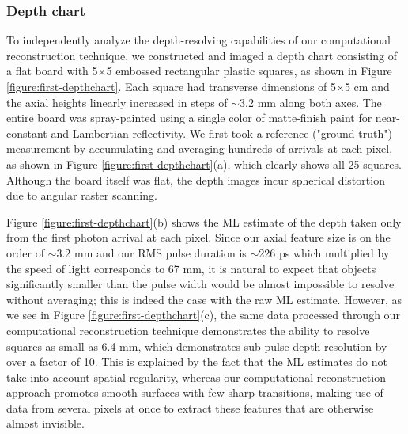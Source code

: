 \subsubsection{Depth chart}

To independently analyze the depth-resolving capabilities of our computational reconstruction technique, we constructed and imaged a depth chart consisting of a flat board with 5$\times$5 embossed rectangular plastic squares, as shown in Figure \ref{figure:first-depthchart}. Each square had transverse dimensions of 5$\times$5 cm and the axial heights linearly increased in steps of $\sim$3.2 mm along both axes. The entire board was spray-painted using a single color of matte-finish paint for near-constant and Lambertian reflectivity. We first took a reference ("ground truth") measurement by accumulating and averaging hundreds of arrivals at each pixel, as shown in Figure \ref{figure:first-depthchart}(a), which clearly shows all 25 squares. Although the board itself was flat, the depth images incur spherical distortion due to angular raster scanning.

Figure \ref{figure:first-depthchart}(b) shows the ML estimate of the depth taken only from the first photon arrival at each pixel. Since our axial feature size is on the order of $\sim$3.2 mm and our RMS pulse duration is $\sim$226 ps which multiplied by the speed of light corresponds to 67 mm, it is natural to expect that objects significantly smaller than the pulse width would be almost impossible to resolve without averaging; this is indeed the case with the raw ML estimate. However, as we see in Figure \ref{figure:first-depthchart}(c), the same data processed through our computational reconstruction technique demonstrates the ability to resolve squares as small as 6.4 mm, which demonstrates sub-pulse depth resolution by over a factor of 10. This is explained by the fact that the ML estimates do not take into account spatial regularity, whereas our computational reconstruction approach promotes smooth surfaces with few sharp transitions, making use of data from several pixels at once to extract these features that are otherwise almost invisible.

